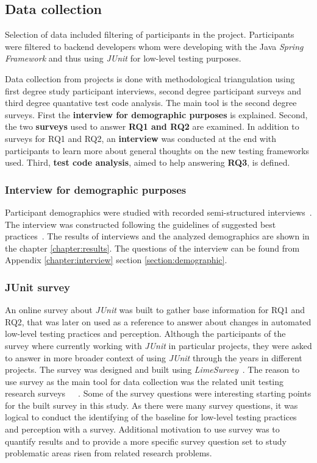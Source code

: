 \subsection{Data collection}
    Selection of data included filtering of participants in the project. Participants were filtered to backend developers
    whom were developing with the Java \textit{Spring Framework} and thus using \textit{JUnit}  for low-level testing purposes.

    Data collection from projects is done with methodological triangulation using first degree study participant interviews, second degree
    participant surveys and third degree quantative test code analysis. The main tool is the second degree surveys.
    First the \textbf{interview for demographic purposes} is explained. Second, the two \textbf{surveys} used to answer
    \textbf{RQ1 and RQ2} are examined. In addition to surveys for RQ1 and RQ2, an \textbf{interview} was conducted at the end with participants to
    learn more about general thoughts on the new testing frameworks used.
    Third, \textbf{test code analysis}, aimed to help answering \textbf{RQ3}, is defined.

    \subsubsection{Interview for demographic purposes}
    Participant demographics were studied with recorded semi-structured interviews~\cite{cohen2006qualitative}.
    The interview was constructed following the guidelines of suggested best practices~\cite{kitchenham2002preliminary}.
    The results of interviews and the analyzed demographics are shown in the chapter
    \ref{chapter:results}. The questions of the interview can be found from Appendix \ref{chapter:interview} section
    \ref{section:demographic}.

    \subsubsection{JUnit survey}
    An online survey about \textit{JUnit} was built to gather base information for RQ1 and RQ2, that was
    later on used as a reference to answer about changes in automated low-level testing practices and perception. Although
    the participants of the survey where currently working with \textit{JUnit} in particular projects, they were asked to answer
    in more broader context of using \textit{JUnit} through the years in different projects.
    The survey was designed and built using \textit{LimeSurvey}~\cite{limesurvey}. The reason to use survey as the main tool for data collection
    was the related unit testing research surveys~\cite{williams2009effectiveness}~\cite{daka2014survey}~\cite{li2016automatically}.
    Some of the survey questions were interesting starting points
    for the built survey in this study. As there were many survey questions, it was logical to conduct the identifying
    of the baseline for low-level testing practices and perception with a survey. Additional motivation to use
    survey was to quantify results and to provide a more specific survey question set to study problematic
    areas risen from related research problems.


